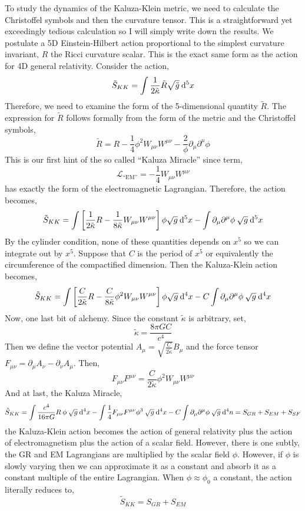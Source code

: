 \documentclass[11pt, a4paper]{article}
\begin{document}
To study the dynamics of the Kaluza-Klein metric, we need to calculate the Christoffel symbols and then the curvature tensor. This is a straightforward yet exceedingly tedious calculation so I will simply write down the results. We postulate a 5D Einstein-Hilbert action proportional to the simplest curvature invariant, $R$ the Ricci curvature scalar. This is the exact same form as the action for 4D general relativity. Consider the action,
\[ \tilde{S}_{KK} = \int \frac{1}{2 \tilde{\kappa}} \tilde{R} \sqrt{\tilde{g}} \: \mathrm{d}^{5} x\]
Therefore, we need to examine the form of the 5-dimensional quantity $\tilde{R}$. The expression for $\tilde{R}$ follows formally from the form of the metric and the Christoffel symbols,
\[ \tilde{R} = R  - \frac{1}{4} \phi^2 W_{\mu \nu} W^{\mu \nu} - \frac{2}{\phi} \partial_\mu \partial^\mu \phi \]
This is our first hint of the so called ``Kaluza Miracle'' since term,
\[ \mathcal{L}_{\text{``EM''}} = - \frac{1}{4} W_{\mu \nu} W^{\mu \nu} \] 
has exactly the form of the electromagnetic Lagrangian. Therefore, the action becomes,
\[ \tilde{S}_{KK} = \int \left[ \frac{1}{2 \tilde{\kappa}} R - \frac{1}{8 \tilde{\kappa}} W_{\mu \nu} W^{\mu \nu} \right] \phi \sqrt{g} \: \mathrm{d}^{5} x - \int \partial_\mu \partial^\mu \phi \: \sqrt{g} \: \mathrm{d}^{5} x \]
By the cylinder condition, none of these quantities depends on $x^5$ so we can integrate out by $x^5$. Suppose that $C$ is the period of $x^5$ or equivalently the circumference of the compactified dimension. Then the Kaluza-Klein action becomes,
\[ \tilde{S}_{KK} = \int \left[ \frac{C}{2 \tilde{\kappa}} R - \frac{C}{8 \tilde{\kappa}} \phi^2 W_{\mu \nu} W^{\mu \nu} \right] \phi \sqrt{g} \: \mathrm{d}^{4} x - C \int \partial_\mu \partial^\mu \phi \: \sqrt{g} \: \mathrm{d}^{4} x \]
Now, one last bit of alchemy. Since the constant $\tilde{\kappa}$ is arbitrary, set,
\[ \tilde{\kappa} = \frac{8 \pi G C}{c^4} \] 
Then we define the vector potential $A_\mu = \sqrt{\frac{C}{2 \tilde{\kappa}}} B_\mu$ and the force tensor $F_{\mu \nu} = \partial_\mu A_\nu - \partial_\nu A_\mu$. Then, 
\[ F_{\mu \nu} F^{\mu \nu} = \frac{C}{2 \tilde{\kappa}} \phi^2 W_{\mu \nu} W^{\mu \nu} \]
And at last, the Kaluza Miracle,
\[ \tilde{S}_{KK} = \int \frac{c^4}{16 \pi G} R \: \phi \: \sqrt{g} \: \mathrm{d}^{4} x - \int \frac{1}{4} F_{\mu \nu} F^{\mu \nu} \phi^3 \: \sqrt{g} \: \mathrm{d}^{4} x - C \int \partial_\mu \partial^\mu \phi \: \sqrt{g} \: \mathrm{d}^{4} n = S_{GR} + S_{EM} + S_{SF} \]
the Kaluza-Klein action becomes the action of general relativity plus the action of electromagnetism plus the action of a scalar field. However, there is one subtly, the GR and EM Lagrangians are multiplied by the scalar field $\phi$. However, if $\phi$ is slowly varying then we can approximate it as a constant and absorb it as a constant multiple of the entire Lagrangian. When $\phi \approx \phi_0$ a constant, the action literally reduces to,
\[ \tilde{S}_{KK} = S_{GR} + S_{EM} \]
\end{document}
